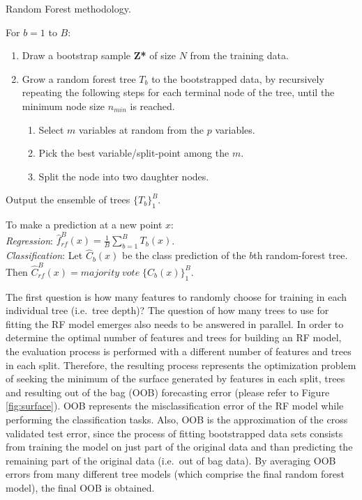\documentclass[preprint, 3p,
authoryear]{elsarticle} %
\begin{document}
\begin{algorithm}
    \caption{Random Forest methodology.}
    \begin{algorithmic}[1]
      \item For {$b=1$ to $B$:}
        \begin{enumerate}[label=(\alph*)]
          \item Draw a bootstrap sample \textbf{Z*} of size $N$ from the training data.
          \item Grow a random forest tree $T_b$ to the bootstrapped data, by recursively repeating the following steps for each terminal node of the tree, until the minimum node size $n_{min}$ is reached.
            \begin{enumerate}[label=\roman*]
              \item Select $m$ variables at random from the $p$ variables.
              \item Pick the best variable/split-point among the $m$.
              \item Split the node into two daughter nodes.
            \end{enumerate}
       \end{enumerate}
  \item Output the ensemble of trees $\{T_b\}^B_1$.
    \end{algorithmic}
    \vspace{0.2cm}
    To make a prediction at a new point $x$:\\[0.2cm]
    \textit {Regression}: $\widehat{f}^B_{rf}(x)= \frac{1}{B} \sum_{b=1}^B T_b (x)$.\\[0.2cm]
    \textit {Classification}: Let $\widehat{C}_b(x)$ be the class prediction of the $b$th random-forest tree. \\ 
    \phantom{Classification } Then $\widehat{C}^B_{rf}(x)=majority\;vote\; \{{C}_b(x)\}^B_1$.
    \label{alg:RF}
\end{algorithm}

The first question is how many features to randomly choose for training
in each individual tree (i.e.~tree depth)? The question of how many
trees to use for fitting the RF model emerges also needs to be answered
in parallel. In order to determine the optimal number of features and
trees for building an RF model, the evaluation process is performed with
a different number of features and trees in each split. Therefore, the
resulting process represents the optimization problem of seeking the
minimum of the surface generated by features in each split, trees and
resulting out of the bag (OOB) forecasting error (please refer to Figure
\ref{fig:surface}). OOB represents the misclassification error of the RF
model while performing the classification tasks. Also, OOB is the
approximation of the cross validated test error, since the process of
fitting bootstrapped data sets consists from training the model on just
part of the original data and than predicting the remaining part of the
original data (i.e.~out of bag data). By averaging OOB errors from many
different tree models (which comprise the final random forest model),
the final OOB is obtained.
\end{document}
